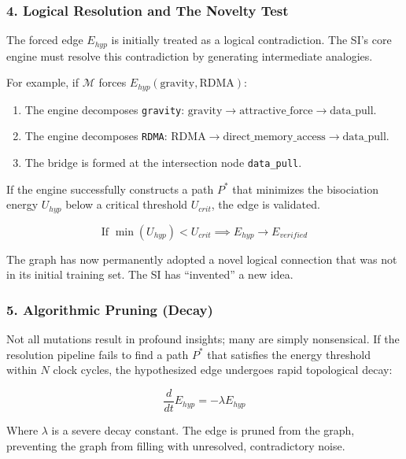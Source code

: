 \documentclass[
  11pt,
  a4paper,
]{article}
\providecommand{\tightlist}{%
  \setlength{\itemsep}{0pt}\setlength{\parskip}{0pt}}
\begin{document}
\subsubsection{4. Logical Resolution and The Novelty
Test}\label{logical-resolution-and-the-novelty-test}

The forced edge \(E_{hyp}\) is initially treated as a logical
contradiction. The SI's core engine must resolve this contradiction by
generating intermediate analogies.

For example, if \(\mathcal{M}\) forces
\(E_{hyp}(\text{gravity}, \text{RDMA})\):

\begin{enumerate}
\def\labelenumi{\arabic{enumi}.}
\tightlist
\item
  The engine decomposes \texttt{gravity}:
  \(\text{gravity} \to \text{attractive\_force} \to \text{data\_pull}\).
\item
  The engine decomposes \texttt{RDMA}:
  \(\text{RDMA} \to \text{direct\_memory\_access} \to \text{data\_pull}\).
\item
  The bridge is formed at the intersection node \texttt{data\_pull}.
\end{enumerate}

If the engine successfully constructs a path \(P^*\) that minimizes the
bisociation energy \(U_{hyp}\) below a critical threshold \(U_{crit}\),
the edge is validated.

\[ \text{If } \min(U_{hyp}) < U_{crit} \implies E_{hyp} \to E_{verified} \]

The graph has now permanently adopted a novel logical connection that
was not in its initial training set. The SI has ``invented'' a new idea.

\subsubsection{5. Algorithmic Pruning
(Decay)}\label{algorithmic-pruning-decay}

Not all mutations result in profound insights; many are simply
nonsensical. If the resolution pipeline fails to find a path \(P^*\)
that satisfies the energy threshold within \(N\) clock cycles, the
hypothesized edge undergoes rapid topological decay:

\[ \frac{d}{dt} E_{hyp} = -\lambda E_{hyp} \]

Where \(\lambda\) is a severe decay constant. The edge is pruned from
the graph, preventing the graph from filling with unresolved,
contradictory noise.
\end{document}
